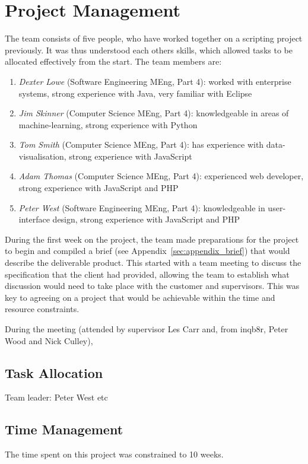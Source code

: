 \section{Project Management}

The team consists of five people, who have worked together on a scripting project previously. It was thus understood each others skills, which allowed tasks to be allocated effectively from the start. The team members are:
\begin{enumerate}
\item \textit{Dexter Lowe} (Software Engineering MEng, Part 4): worked with enterprise systems, strong experience with Java, very familiar with Eclipse
\item \textit{Jim Skinner} (Computer Science MEng, Part 4): knowledgeable in areas of machine-learning, strong experience with Python
\item \textit{Tom Smith} (Computer Science MEng, Part 4): has experience with data-visualisation, strong experience with JavaScript
\item \textit{Adam Thomas} (Computer Science MEng, Part 4): experienced web developer, strong experience with JavaScript and PHP
\item \textit{Peter West} (Software Engineering MEng, Part 4): knowledgeable in user-interface design, strong experience with JavaScript and PHP
\end{enumerate}

During the first week on the project, the team made preparations for the project to begin and compiled a brief (see Appendix~\ref{sec:appendix_brief}) that would describe the deliverable product. This started with a team meeting to discuss the specification that the client had provided, allowing the team to establish what discussion would need to take place with the customer and supervisors. This was key to agreeing on a project that would be achievable within the time and resource constraints.

During the meeting (attended by supervisor Les Carr and, from inqb8r, Peter Wood and Nick Culley),

\subsection{Task Allocation}
Team leader: Peter West
etc

\subsection{Time Management}
The time spent on this project was constrained to 10 weeks.

